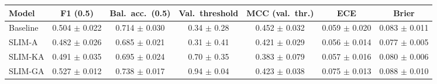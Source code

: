 \begin{tabular}{lcccccc}
\toprule
Model & F1 (0.5) & Bal.\ acc.\ (0.5) & Val.\ threshold & MCC (val.\ thr.) & ECE & Brier \\
\midrule
Baseline & 0.504 $\pm$ 0.022 & 0.714 $\pm$ 0.030 & 0.34 $\pm$ 0.28 & 0.452 $\pm$ 0.032 & 0.059 $\pm$ 0.020 & 0.083 $\pm$ 0.011 \\
SLIM-A & 0.482 $\pm$ 0.026 & 0.685 $\pm$ 0.021 & 0.31 $\pm$ 0.41 & 0.421 $\pm$ 0.029 & 0.056 $\pm$ 0.014 & 0.077 $\pm$ 0.005 \\
SLIM-KA & 0.491 $\pm$ 0.035 & 0.695 $\pm$ 0.024 & 0.70 $\pm$ 0.35 & 0.383 $\pm$ 0.079 & 0.057 $\pm$ 0.016 & 0.080 $\pm$ 0.006 \\
SLIM-GA & 0.527 $\pm$ 0.012 & 0.738 $\pm$ 0.017 & 0.94 $\pm$ 0.04 & 0.423 $\pm$ 0.038 & 0.075 $\pm$ 0.013 & 0.088 $\pm$ 0.010 \\
\bottomrule
\end{tabular}
